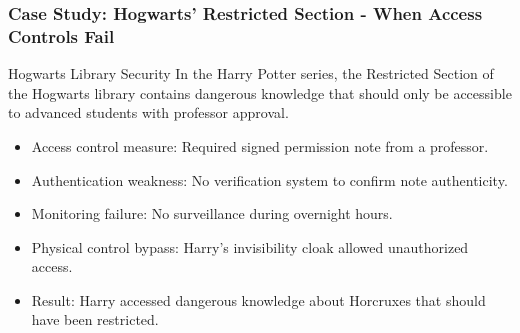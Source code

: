 \documentclass{beamer}
\begin{document}
    \begin{frame}
    \frametitle{Case Study: Hogwarts' Restricted Section - When Access Controls Fail}
    
    \begin{exampleblock}{Hogwarts Library Security}
    In the Harry Potter series, the Restricted Section of the Hogwarts library contains dangerous knowledge that should only be accessible to advanced students with professor approval.
    \end{exampleblock}
    
    \begin{itemize}
    \item Access control measure: Required signed permission note from a professor.
    \item Authentication weakness: No verification system to confirm note authenticity.
    \item Monitoring failure: No surveillance during overnight hours.
    \item Physical control bypass: Harry's invisibility cloak allowed unauthorized access.
    \item Result: Harry accessed dangerous knowledge about Horcruxes that should have been restricted.
    \end{itemize}
    
    \end{frame}
    
\end{document}
